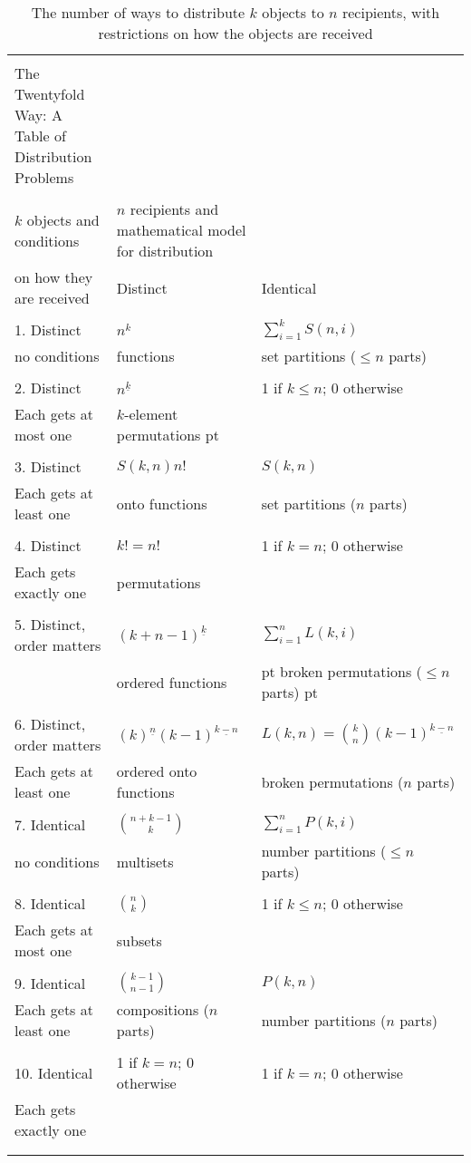 \documentclass[10pt,]{book}
\theoremstyle{plain}
\theoremstyle{definition}
\numberwithin{equation}{chapter}
\newcommand{\hrulethin}  {\noalign{\hrule height 0.04em}}
\newcommand{\hrulemedium}{\noalign{\hrule height 0.07em}}
\begin{document}
\begin{table}
\centering
\begin{tabular}{lll}
&&\tabularnewline\hrulethin
The Twentyfold Way: A Table of Distribution Problems\tabularnewline[0pt]
&&\tabularnewline\hrulemedium
\(k\) objects and conditions&\(n\) recipients and mathematical model for distribution\tabularnewline[0pt]
on how they are received&Distinct&Identical\tabularnewline[0pt]
&&\tabularnewline\hrulemedium
1.  Distinct&\(n^k\)&\(\sum_{i=1}^kS(n,i)\)\tabularnewline[0pt]
no conditions&functions&set partitions (\(\le n\) parts)\tabularnewline[0pt]
&&\tabularnewline\hrulethin
2.  Distinct&\(n^{\underline{k}}\)&1 if \(k\le n\); 0 otherwise\tabularnewline[0pt]
Each gets at most one&\kern -2pt \(k\)-element permutations\kern -2 pt&\tabularnewline[0pt]
&&\tabularnewline\hrulethin
3.  Distinct&\(S(k,n)n!\)&\(S(k,n)\)\tabularnewline[0pt]
Each gets at least one&onto functions&set partitions (\(n\) parts)\tabularnewline[0pt]
&&\tabularnewline\hrulethin
4. Distinct&\(k!=n!\)&1 if \(k=n\); 0 otherwise\tabularnewline[0pt]
Each gets exactly one&permutations&\tabularnewline[0pt]
&&\tabularnewline\hrulethin
5.  Distinct, order matters&\((k+n-1)^{\underline{k}}\)&\(\sum_{i=1}^n L(k,i)\)\tabularnewline[0pt]
&ordered functions&\hglue -3 pt broken permutations (\(\le n\) parts)\kern -3 pt\tabularnewline[0pt]
&&\tabularnewline\hrulethin
6.  Distinct, order matters&\((k)^{\underline{n}}(k-1)^{\underline{k-n}}\)&\(L(k,n)=
\binom{k}{n}(k-1)^{\underline{k-n}}\)\tabularnewline[0pt]
Each gets at least one&ordered onto functions&broken permutations (\(n\) parts)\tabularnewline[0pt]
&&\tabularnewline\hrulethin
7.  Identical&\(\binom{n+k-1}{k}\)&\(\sum_{i=1}^nP(k,i)\)\tabularnewline[0pt]
no conditions&multisets&number partitions (\(\le n\) parts)\tabularnewline[0pt]
&&\tabularnewline\hrulethin
8.  Identical&\(\binom{n}{k}\)&1 if \(k\le n\); 0 otherwise\tabularnewline[0pt]
Each gets at most one&subsets&\tabularnewline[0pt]
&&\tabularnewline\hrulethin
9.  Identical&\(\binom{k-1}{n-1}\)&\(P(k,n)\)\tabularnewline[0pt]
Each gets at least one&compositions (\(n\) parts)&number partitions (\(n\) parts)\tabularnewline[0pt]
&&\tabularnewline\hrulethin
10.  Identical&1 if \(k=n\); 0 otherwise&1 if \(k=n\); 0 otherwise\tabularnewline[0pt]
Each gets exactly one&&\tabularnewline[0pt]
&&\tabularnewline\hrulethin
\end{tabular}
\caption{The number of ways to distribute \(k\) objects to \(n\) recipients, with restrictions on how the objects are received\label{lastdistributiontable}}
\end{table}
\typeout{************************************************}
\typeout{************************************************}
\end{document}
